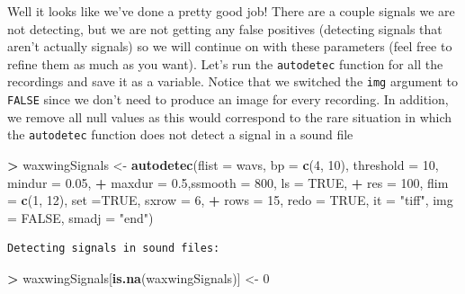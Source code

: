 \documentclass[
]{krantz}
\makeatletter
\newenvironment{Shaded}{\begin{snugshade}}{\end{snugshade}}
\newcommand{\DataTypeTok}[1]{\textcolor[rgb]{0.27,0.27,0.27}{#1}}
\newcommand{\DecValTok}[1]{\textcolor[rgb]{0.06,0.06,0.06}{#1}}
\newcommand{\FloatTok}[1]{\textcolor[rgb]{0.06,0.06,0.06}{#1}}
\newcommand{\KeywordTok}[1]{\textcolor[rgb]{0.27,0.27,0.27}{\textbf{#1}}}
\newcommand{\NormalTok}[1]{#1}
\newcommand{\OperatorTok}[1]{\textcolor[rgb]{0.43,0.43,0.43}{\textbf{#1}}}
\newcommand{\OtherTok}[1]{\textcolor[rgb]{0.37,0.37,0.37}{#1}}
\newcommand{\StringTok}[1]{\textcolor[rgb]{0.5,0.5,0.5}{#1}}
\newenvironment{kframe}{%
\medskip{}
\setlength{\fboxsep}{.8em}
 \def\at@end@of@kframe{}%
 \ifinner\ifhmode%
  \def\at@end@of@kframe{\end{minipage}}%
  \begin{minipage}{\columnwidth}%
 \fi\fi%
 \def\FrameCommand##1{\hskip\@totalleftmargin \hskip-\fboxsep
 \colorbox{shadecolor}{##1}\hskip-\fboxsep
     \hskip-\linewidth \hskip-\@totalleftmargin \hskip\columnwidth}%
 \MakeFramed {\advance\hsize-\width
   \@totalleftmargin\z@ \linewidth\hsize
   \@setminipage}}%
 {\par\unskip\endMakeFramed%
 \at@end@of@kframe}
\renewenvironment{Shaded}{\begin{kframe}}{\end{kframe}}
\makeatother
\begin{document}
Well it looks like we've done a pretty good job! There are a couple signals we are not detecting, but we are not getting any false positives (detecting signals that aren't actually signals) so we will continue on with these parameters (feel free to refine them as much as you want). Let's run the \texttt{autodetec} function for all the recordings and save it as a variable. Notice that we switched the \texttt{img} argument to \texttt{FALSE} since we don't need to produce an image for every recording. In addition, we remove all null values as this would correspond to the rare situation in which the \texttt{autodetec} function does not detect a signal in a sound file

\begin{Shaded}
\begin{Highlighting}[]
\OperatorTok{\textgreater{}}\StringTok{ }\NormalTok{waxwingSignals \textless{}{-}}\StringTok{ }\KeywordTok{autodetec}\NormalTok{(}\DataTypeTok{flist =}\NormalTok{ wavs, }\DataTypeTok{bp =} \KeywordTok{c}\NormalTok{(}\DecValTok{4}\NormalTok{, }\DecValTok{10}\NormalTok{), }\DataTypeTok{threshold =} \DecValTok{10}\NormalTok{, }\DataTypeTok{mindur =} \FloatTok{0.05}\NormalTok{,  }
\OperatorTok{+}\StringTok{           }\DataTypeTok{maxdur =} \FloatTok{0.5}\NormalTok{,}\DataTypeTok{ssmooth =} \DecValTok{800}\NormalTok{, }\DataTypeTok{ls =} \OtherTok{TRUE}\NormalTok{,  }
\OperatorTok{+}\StringTok{           }\DataTypeTok{res =} \DecValTok{100}\NormalTok{, }\DataTypeTok{flim =} \KeywordTok{c}\NormalTok{(}\DecValTok{1}\NormalTok{, }\DecValTok{12}\NormalTok{), }\DataTypeTok{set =}\OtherTok{TRUE}\NormalTok{, }\DataTypeTok{sxrow =} \DecValTok{6}\NormalTok{,  }
\OperatorTok{+}\StringTok{           }\DataTypeTok{rows =} \DecValTok{15}\NormalTok{, }\DataTypeTok{redo =} \OtherTok{TRUE}\NormalTok{, }\DataTypeTok{it =} \StringTok{"tiff"}\NormalTok{, }\DataTypeTok{img =} \OtherTok{FALSE}\NormalTok{, }\DataTypeTok{smadj =} \StringTok{"end"}\NormalTok{) }
\end{Highlighting}
\end{Shaded}

\begin{verbatim}
Detecting signals in sound files:
\end{verbatim}

\begin{Shaded}
\begin{Highlighting}[]
\OperatorTok{\textgreater{}}\StringTok{ }\NormalTok{waxwingSignals[}\KeywordTok{is.na}\NormalTok{(waxwingSignals)] \textless{}{-}}\StringTok{ }\DecValTok{0} 
\end{Highlighting}
\end{Shaded}
\end{document}
